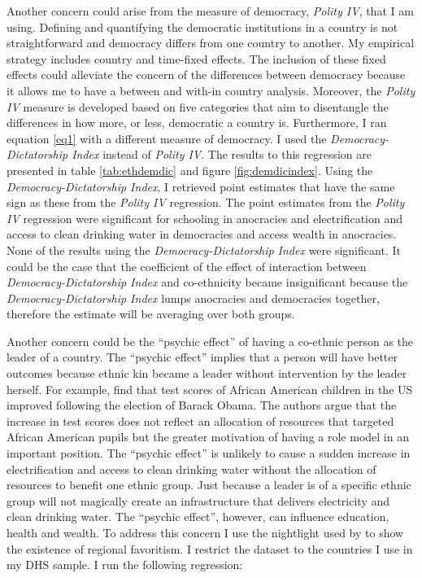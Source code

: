 \documentclass{wptemp}
\begin{document}
Another concern could arise from the measure of democracy, \textit{Polity IV}, that I am using. Defining and quantifying the democratic institutions in a country is not straightforward and democracy differs from one country to another. My empirical strategy includes country and time-fixed effects. The inclusion of these fixed effects could alleviate the concern of the differences between democracy because it allows me to have a between and with-in country analysis. Moreover, the \textit{Polity IV} measure is developed based on five categories that aim to disentangle the differences in how more, or less, democratic a country is. Furthermore, I ran equation \ref{eq1} with a different measure of democracy. I used the \textit{Democracy-Dictatorship Index} instead of \textit{Polity IV}. The results to this regression are presented in table \ref{tab:ethdemdic} and figure \ref{fig:demdicindex}. Using the \textit{Democracy-Dictatorship Index}, I retrieved point estimates that have the same sign as these from the \textit{Polity IV} regression. The point estimates from the \textit{Polity IV} regression were significant for schooling in anocracies and electrification and access to clean drinking water in democracies and access wealth in anocracies. None of the results using the \textit{Democracy-Dictatorship Index} were significant. It could be the case that the coefficient of the effect of interaction between \textit{Democracy-Dictatorship Index} and co-ethnicity became insignificant because the \textit{Democracy-Dictatorship Index} lumps anocracies and democracies together, therefore the estimate will be averaging over both groups. 





Another concern could be the ``psychic effect'' of having a co-ethnic person as the leader of a country. The ``psychic effect'' implies that a person will have better outcomes because ethnic kin became a leader without intervention by the leader herself. For example, \citet{marx2009obama} find that test scores of African American children in the US improved following the election of Barack Obama. The authors argue that the increase in test scores does not reflect an allocation of resources that targeted African American pupils but the greater motivation of having a role model in an important position. The ``psychic effect'' is unlikely to cause a sudden increase in electrification and access to clean drinking water without the allocation of resources to benefit one ethnic group. Just because a leader is of a specific ethnic group will not magically create an infrastructure that delivers electricity and clean drinking water. The ``psychic effect'', however, can influence education, health and wealth. To address this concern I use the nightlight used by \citet{hodler2014regional} to show the existence of regional favoritism. I restrict the dataset to the countries I use in my DHS sample. I run the following regression:
\end{document}
